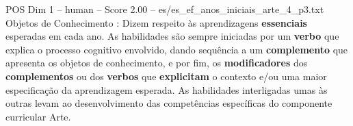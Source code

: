 \begin{textsample}{POS Dim 1 – human – Score 2.00 – es/es\_ef\_anos\_iniciais\_arte\_4\_p3.txt}  \label{ex:f1_pos_005}
Objetos de Conhecimento : Dizem respeito às aprendizagens \textbf{essenciais} esperadas em cada ano.
As habilidades são sempre iniciadas por um \textbf{verbo} que explica o processo cognitivo envolvido, dando sequência a um \textbf{complemento} que apresenta os objetos de conhecimento, e por fim, os \textbf{modificadores} dos \textbf{complementos} ou dos \textbf{verbos} que \textbf{explicitam} o contexto e/ou uma maior especificação da aprendizagem esperada.
As habilidades interligadas umas às outras levam ao desenvolvimento das competências específicas do componente curricular Arte.

\end{textsample}
